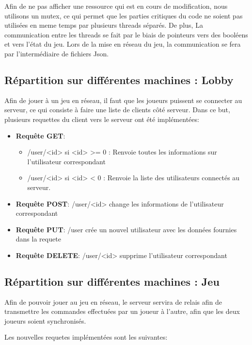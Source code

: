 Afin de ne pas afficher une ressource qui est en cours de modification, nous utilisons un mutex, ce qui permet que les parties critiques du code ne soient pas utilisées en meme temps par plusieurs threads séparés. De plus, La communication entre les threads se fait par le biais de pointeurs vers des booléens et vers l'état du jeu. Lors de la mise en réseau du jeu, la communication se fera par l'intermédiaire de fichiers Json.

\subsection{Répartition sur différentes machines : Lobby}
Afin de jouer à un jeu en réseau, il faut que les joueurs puissent se connecter au serveur, ce qui consiste à faire une liste de clients c\^oté serveur. Dans ce but, plusieurs requettes du client vers le serveur ont été implémentées:
\begin{itemize}
    \item \textbf{Requ\^ete GET}:
    \begin{itemize}
        \item /user/<id> si <id> >= 0 : Renvoie toutes les informations sur l'utilisateur correspondant
        \item /user/<id> si <id> < 0 : Renvoie la liste des utilisateurs connectés au serveur.
    \end{itemize}
    \item \textbf{Requ\^ete POST}: /user/<id> change les informations de l'utilisateur correspondant
    \item \textbf{Requ\^ete PUT}: /user crée un nouvel utilisateur avec les données fournies dans la requete
    \item \textbf{Requ\^ete DELETE}: /user/<id> supprime l'utilisateur correspondant
\end{itemize}

\subsection{Répartition sur différentes machines : Jeu}
    Afin de pouvoir jouer au jeu en réseau, le serveur servira de relais afin de transmettre les commandes effectuées par un joueur à l'autre, afin que les deux joueurs soient synchronisés.
    
    Les nouvelles requetes implémentées sont les suivantes:
    
